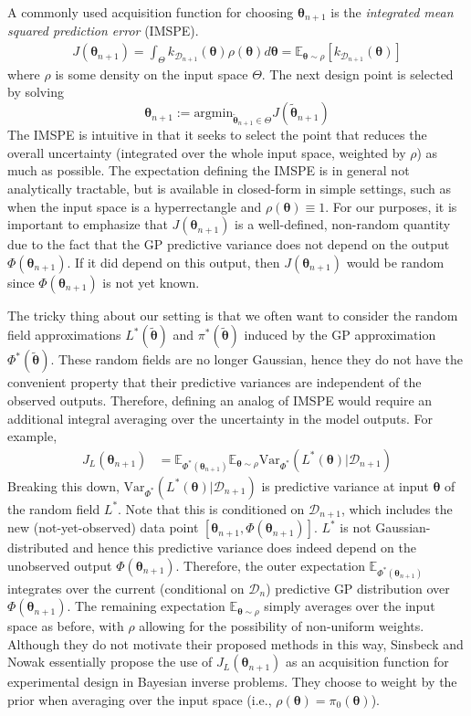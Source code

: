 \documentclass[12pt]{article}
\newcommand{\E}{\mathbb{E}}
\newcommand{\Var}{\mathrm{Var}}
\newcommand{\btheta}{\boldsymbol{\theta}}
\begin{document}
A commonly used acquisition function for choosing $\btheta_{n+1}$ is the \textit{integrated mean squared prediction error} (IMSPE). 
\begin{align*}
J(\btheta_{n+1}) = \int_{\Theta} k_{\mathcal{D}_{n+1}}(\btheta) \rho(\btheta) d\btheta = \E_{\btheta \sim \rho} \left[k_{\mathcal{D}_{n+1}}(\btheta) \right]
\end{align*}
where $\rho$ is some density on the input space $\Theta$. The next design point is selected by solving 
\[\btheta_{n + 1} := \text{argmin}_{\tilde{\btheta}_{n+1} \in \Theta} J(\tilde{\btheta}_{n+1}) \]
The IMSPE is intuitive in that it seeks to select the point that reduces the overall uncertainty (integrated over the whole input space, weighted by $\rho$) as much as possible. 
The expectation defining the IMSPE is in general not analytically tractable, but is available in closed-form in simple settings, such as when the input space is a 
hyperrectangle and $\rho(\btheta) \equiv 1$. For our purposes, it is important to emphasize that $J(\btheta_{n+1})$ is a well-defined, non-random quantity due to the fact 
that the GP predictive variance does not depend on the output $\Phi(\btheta_{n+1})$. If it did depend on this output, then $J(\btheta_{n+1})$ would be random since 
$\Phi(\btheta_{n+1})$ is not yet known. 

The tricky thing about our setting is that we often want to consider the random field approximations $L^*(\tilde{\btheta})$ and $\pi^*(\tilde{\btheta})$ induced by the GP approximation 
$\Phi^*(\tilde{\btheta})$. These random fields are no longer Gaussian, hence they do not have the convenient property that their predictive variances are independent of the observed 
outputs. Therefore, defining an analog of IMSPE would require an additional integral averaging over the uncertainty in the model outputs. For example, 
\begin{align*}
J_{L}(\btheta_{n+1}) &= \E_{\Phi^*(\btheta_{n+1})} \E_{\btheta \sim \rho} \Var_{\Phi^*} \left(L^*(\btheta) | \mathcal{D}_{n+1} \right)
\end{align*}
Breaking this down, $\Var_{\Phi^*} \left(L^*(\btheta) | \mathcal{D}_{n+1} \right)$ is predictive variance at input $\btheta$ of the random field $L^*$. Note that this is conditioned on 
$\mathcal{D}_{n+1}$, which includes the new (not-yet-observed) data point $[\btheta_{n+1}, \Phi(\btheta_{n+1})]$. $L^*$ is not Gaussian-distributed and hence this predictive variance
does indeed depend on the unobserved output $\Phi(\btheta_{n+1})$. Therefore, the outer expectation $ \E_{\Phi^*(\btheta_{n+1})}$ integrates over the current 
(conditional on $\mathcal{D}_n$) predictive GP distribution over $\Phi(\btheta_{n+1})$. The remaining expectation $\E_{\btheta \sim \rho}$ simply averages over the input 
space as before, with $\rho$ allowing for the possibility of non-uniform weights. Although they do not motivate their proposed methods in this way, Sinsbeck and Nowak 
\cite{doi:10.1137/15M1047659} essentially propose the use of $J_{L}(\btheta_{n+1})$ as an acquisition function for experimental design in Bayesian inverse problems. They 
choose to weight by the prior when averaging over the input space (i.e., $\rho(\btheta) = \pi_0(\btheta)$). 
\end{document}
